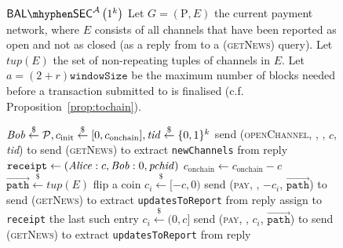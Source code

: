   \begin{figure}[!htbp]
    \begin{gamebox}{$\mathsf{BAL \mhyphen SEC}^{\adversary}\left(1^k\right)$}
      Let $G = (\mathrm{P}, E)$ the current payment network, where $E$ consists
      of all channels that have been reported as open and not as closed (as a
      reply from \fpaynet{} to a (\textsc{getNews}) query). Let
      $\mathit{tup}(E)$ the set of non-repeating tuples of channels in $E$. Let
      $a = (2 + r)\mathtt{windowSize}$ be the maximum number of blocks needed
      before a transaction submitted to \ledger{} is finalised (c.f.
      Proposition~\ref{prop:tochain}).
      \begin{algorithmic}[1]
          \State {}
          \State $\mathit{Bob} \overset{\$}{\gets} \mathcal{P}, c_{\mathrm{init}}
          \overset{\$}{\gets} [0, c_{\mathrm{onchain}}], \mathit{tid}
          \overset{\$}{\gets} \{0, 1\}^k$
          \State send (\textsc{openChannel}, \alice, \bob, $c$, \textit{tid}) to
          \alice
          \Repeat
            \State send (\textsc{getNews}) to \alice{}
            \State extract \texttt{newChannels} from reply
          \State $\mathtt{receipt} \gets (\mathit{Alice}: c, \mathit{Bob}: 0, \mathit{pchid})$
          \State $c_{\mathrm{onchain}} \gets c_{\mathrm{onchain}} - c$
          \Statex
          \State {}
            \State $\overrightarrow{\mathtt{path}} \overset{\$}{\gets}
            \mathit{tup}(E)$
            \State flip a coin
              \State $c_i \overset{\$}{\gets} [-c, 0)$
              \State send (\textsc{pay}, \bob, $-c_i$,
              $\overrightarrow{\mathtt{path}}$) to \alice
            \Else {}
              \State send (\textsc{getNews}) to \alice{}
              \State extract \texttt{updatesToReport} from reply
                 \State assign to \texttt{receipt} the last such entry
              \EndIf
              \State $c_i \overset{\$}{\gets} (0, c]$
              \State send (\textsc{pay}, \alice, $c_i$,
              $\overrightarrow{\mathtt{path}}$) to \bob
              \State send (\textsc{getNews}) to \alice{}
              \State extract \texttt{updatesToReport} from reply

\end{algorithmic}
\end{gamebox}
\end{figure}
